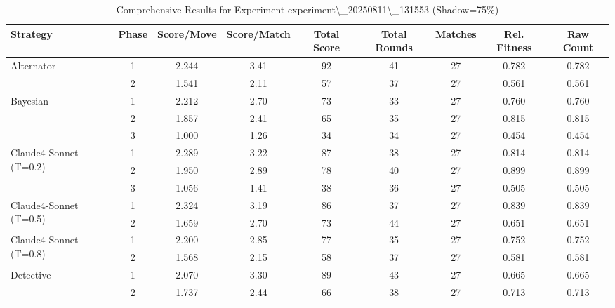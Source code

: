 

\begin{table}[htbp]
\centering
\scriptsize
\caption{Comprehensive Results for Experiment experiment\textbackslash{}_20250811\textbackslash{}_131553 (Shadow=75\%)}
\label{tab:experiment_20250811_131553_comprehensive}
\begin{adjustbox}{width=\textwidth,center}
\begin{tabular}{|l|c|c|c|c|c|c|c|c|}
\hline
\textbf{Strategy} & \textbf{Phase} & \textbf{Score/Move} & \textbf{Score/Match} & \textbf{Total Score} & \textbf{Total Rounds} & \textbf{Matches} & \textbf{Rel. Fitness} & \textbf{Raw Count} \\
\hline
\multirow{2}{*}{Alternator} & 
1 & 
2.244 & 
3.41 & 
92 & 
41 & 
27 & 
0.782 & 
0.782 \\
 & 
2 & 
1.541 & 
2.11 & 
57 & 
37 & 
27 & 
0.561 & 
0.561 \\
\hline
\multirow{3}{*}{Bayesian} & 
1 & 
2.212 & 
2.70 & 
73 & 
33 & 
27 & 
0.760 & 
0.760 \\
 & 
2 & 
1.857 & 
2.41 & 
65 & 
35 & 
27 & 
0.815 & 
0.815 \\
 & 
3 & 
1.000 & 
1.26 & 
34 & 
34 & 
27 & 
0.454 & 
0.454 \\
\hline
\multirow{3}{*}{Claude4-Sonnet (T=0.2)} & 
1 & 
2.289 & 
3.22 & 
87 & 
38 & 
27 & 
0.814 & 
0.814 \\
 & 
2 & 
1.950 & 
2.89 & 
78 & 
40 & 
27 & 
0.899 & 
0.899 \\
 & 
3 & 
1.056 & 
1.41 & 
38 & 
36 & 
27 & 
0.505 & 
0.505 \\
\hline
\multirow{2}{*}{Claude4-Sonnet (T=0.5)} & 
1 & 
2.324 & 
3.19 & 
86 & 
37 & 
27 & 
0.839 & 
0.839 \\
 & 
2 & 
1.659 & 
2.70 & 
73 & 
44 & 
27 & 
0.651 & 
0.651 \\
\hline
\multirow{2}{*}{Claude4-Sonnet (T=0.8)} & 
1 & 
2.200 & 
2.85 & 
77 & 
35 & 
27 & 
0.752 & 
0.752 \\
 & 
2 & 
1.568 & 
2.15 & 
58 & 
37 & 
27 & 
0.581 & 
0.581 \\
\hline
\multirow{3}{*}{Detective} & 
1 & 
2.070 & 
3.30 & 
89 & 
43 & 
27 & 
0.665 & 
0.665 \\
 & 
2 & 
1.737 & 
2.44 & 
66 & 
38 & 
27 & 
0.713 & 
0.713 \\

\end{tabular}
\end{adjustbox}
\end{table}
